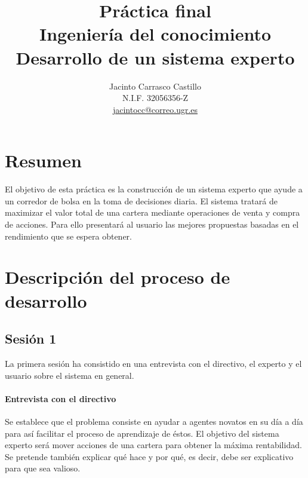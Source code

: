 \documentclass[11pt,leqno]{article}
\title{Práctica final\\
		Ingeniería del conocimiento\\
		Desarrollo de un sistema experto}
\author{Jacinto Carrasco Castillo 	\\
		N.I.F. 32056356-Z			\\ 
		\href{jacintocc@correo.ugr.es}{jacintocc@correo.ugr.es}}
\theoremstyle{definition_wo_parentheses}
\theoremstyle{plain}
\theoremstyle{remark}
\begin{document}
\maketitle

\tableofcontents

\section{Resumen}

	El objetivo de esta práctica es la construcción de un sistema experto que ayude a un corredor de bolsa en la toma de decisiones diaria. El sistema tratará de maximizar el valor total de una cartera mediante operaciones de venta y compra de acciones. Para ello presentará al usuario las mejores propuestas basadas en el rendimiento que se espera obtener. 
	
	
\section{Descripción del proceso de desarrollo}

\subsection{Sesión 1}

	La primera sesión ha consistido en una entrevista con el directivo, el experto y el usuario sobre el sistema en general.
	
\paragraph{Entrevista con el directivo} Se establece que el problema consiste en ayudar a agentes novatos en su día a día para así facilitar el proceso de aprendizaje de éstos. El objetivo del sistema experto será mover acciones de una cartera para obtener la máxima rentabilidad. Se pretende también explicar qué hace y por qué, es decir, debe ser explicativo para que sea valioso.
\end{document}
